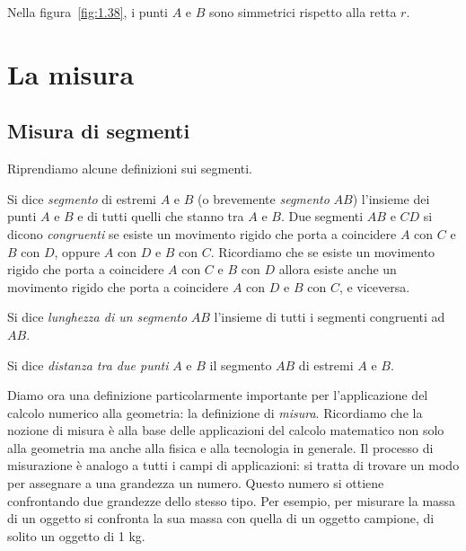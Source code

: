 Nella figura~\ref{fig:1.38}, i punti \(A\) e \(B\) sono simmetrici 
rispetto alla retta \(r\).

\vspazio\ovalbox{\risolvii \ref{ese:1.66}, \ref{ese:1.67}, 
\ref{ese:1.68}, \ref{ese:1.69}, \ref{ese:1.70}, \ref{ese:1.71}, 
\ref{ese:1.72}, \ref{ese:1.73}, \ref{ese:1.74}, \ref{ese:1.75}, 
\ref{ese:1.76}, \ref{ese:1.77}, \ref{ese:1.78},}

\ovalbox{\ref{ese:1.79}, \ref{ese:1.80}, \ref{ese:1.81}, 
\ref{ese:1.82}, \ref{ese:1.83}, \ref{ese:1.84}, \ref{ese:1.85}, 
\ref{ese:1.86}, \ref{ese:1.87}, \ref{ese:1.88}, \ref{ese:1.89}, 
\ref{ese:1.90}, \ref{ese:1.91}, \ref{ese:1.92},\ref{ese:1.93}, 
\ref{ese:1.94}, \ref{ese:1.95},}

\ovalbox{\ref{ese:1.96}, \ref{ese:1.97}, \ref{ese:1.98}, 
\ref{ese:1.99}, \ref{ese:1.100}, \ref{ese:1.101}, \ref{ese:1.102}, 
\ref{ese:1.103}}


\section{La misura}\label{sect:misura}

\subsection{Misura di segmenti}

Riprendiamo alcune definizioni sui segmenti.

Si dice \emph{segmento} di estremi \(A\) e \(B\) (o brevemente 
\emph{segmento} \(AB\)) l'insieme dei punti \(A\) e \(B\) e di tutti quelli 
che stanno tra \(A\) e \(B\).
Due segmenti \(AB\) e \(CD\) si dicono \emph{congruenti} se esiste un 
movimento rigido che porta a coincidere \(A\) con \(C\) e \(B\) con \(D\), 
oppure \(A\) con \(D\) e \(B\) con \(C\). Ricordiamo che se esiste un 
movimento rigido che porta a coincidere \(A\) con \(C\) e \(B\) con \(D\) 
allora esiste anche un movimento rigido che porta a coincidere \(A\) 
con \(D\) e \(B\) con \(C\), e viceversa.

Si dice \emph{lunghezza di un segmento} \(AB\) l'insieme di tutti i 
segmenti congruenti ad \(AB\).

Si dice \emph{distanza tra due punti} \(A\) e \(B\) il segmento \(AB\) di 
estremi \(A\) e \(B\).

Diamo ora una definizione particolarmente importante per 
l'applicazione del calcolo numerico alla geometria: la definizione di 
\emph{misura}. Ricordiamo che la nozione di misura è alla base delle 
applicazioni del calcolo matematico non solo alla geometria ma anche 
alla fisica e alla tecnologia in generale. Il processo di misurazione 
è analogo a tutti i campi di applicazioni: si tratta di trovare un 
modo per assegnare a una grandezza un numero. Questo numero si 
ottiene confrontando due grandezze dello stesso tipo. Per esempio, 
per misurare la massa di un oggetto si confronta la sua massa con 
quella di un oggetto campione, di solito un oggetto di 1 kg.

